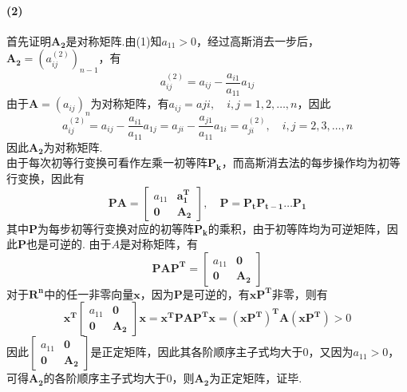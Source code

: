 \paragraph{(2)} 首先证明$\mathbf{A_2}$是对称矩阵.由(1)知$a_{11} > 0$，经过高斯消去一步后，$\mathbf{A_2} = (a_{ij}^{(2)})_{n - 1}$，有
\[a_{ij}^{(2)} = a_{ij} - \frac{a_{i1}}{a_{11}}a_{1j}\]
由于$\mathbf{A} = (a_{ij})_n$为对称矩阵，有$a_{ij} = a{ji}, \quad i, j = 1, 2, \dots, n$，因此
\[a_{ij}^{(2)} = a_{ij} - \frac{a_{i1}}{a_{11}}a_{1j} = a_{ji} - \frac{a_{j1}}{a_{11}}a_{1i} = a_{ji}^{(2)}, \quad i, j = 2, 3, \dots, n\]
因此$\mathbf{A_2}$为对称矩阵.\\
由于每次初等行变换可看作左乘一初等阵$\mathbf{P_k}$，而高斯消去法的每步操作均为初等行变换，因此有
\[\mathbf{PA}=\begin{bmatrix}
a_{11} & \mathbf{a_1^T}\\  
\mathbf{0} & \mathbf{A_2}
\end{bmatrix}, \quad \mathbf{P} = \mathbf{P_tP_{t-1}} \dots \mathbf{P_1}\]
其中$\mathbf{P}$为每步初等行变换对应的初等阵$\mathbf{P_k}$的乘积，由于初等阵均为可逆矩阵，因此$\mathbf{P}$也是可逆的.
由于$A$是对称矩阵，有
\[\mathbf{PAP^T} = \begin{bmatrix}
a_{11} & \mathbf{0} \\  
\mathbf{0} & \mathbf{A_2}
\end{bmatrix}\]
对于$\mathbf{R^n}$中的任一非零向量$\mathbf{x}$，因为$\mathbf{P}$是可逆的，有$\mathbf{xP^T}$非零，则有
\[\mathbf{x^T}\begin{bmatrix}
a_{11} & \mathbf{0} \\  
\mathbf{0} & \mathbf{A_2}
\end{bmatrix}\mathbf{x} = \mathbf{x^T PAP^Tx} = \mathbf{(xP^T)^TA(xP^T)} > 0\]
因此$\begin{bmatrix}
a_{11} & \mathbf{0} \\  
\mathbf{0} & \mathbf{A_2}
\end{bmatrix}$是正定矩阵，因此其各阶顺序主子式均大于0，又因为$a_{11} > 0$，可得$\mathbf{A_2}$的各阶顺序主子式均大于0，则$\mathbf{A_2}$为正定矩阵，证毕.
\newline

